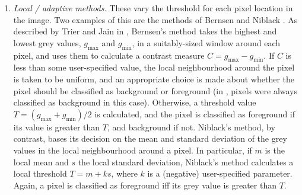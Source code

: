 \begin{enumerate}
\item \emph{Local / adaptive methods.} These vary the threshold for each pixel location in the image. Two examples of this are the methods of Bernsen \cite{bernsen86} and Niblack \cite{niblack86}. As described by Trier and Jain in \cite{trier95}, Bernsen's method takes the highest and lowest grey values, $g_{\mbox{max}}$ and $g_{\mbox{min}}$, in a suitably-sized window around each pixel, and uses them to calculate a contrast measure $C = g_{\mbox{max}} - g_{\mbox{min}}$. If $C$ is less than some user-specified value, the local neighbourhood around the pixel is taken to be uniform, and an appropriate choice is made about whether the pixel should be classified as background or foreground (in \cite{trier95}, pixels were always classified as background in this case). Otherwise, a threshold value $T = (g_{\mbox{max}} + g_{\mbox{min}}) / 2$ is calculated, and the pixel is classified as foreground if its value is greater than $T$, and background if not. Niblack's method, by contrast, bases its decision on the mean and standard deviation of the grey values in the local neighbourhood around a pixel. In particular, if $m$ is the local mean and $s$ the local standard deviation, Niblack's method calculates a local threshold $T = m + ks$, where $k$ is a (negative) user-specified parameter. Again, a pixel is classified as foreground iff its grey value is greater than $T$.

\end{enumerate}


